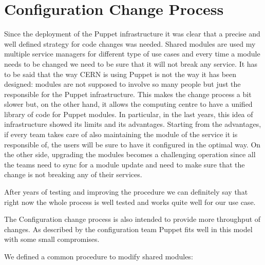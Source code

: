 \section{Configuration Change Process}

Since the deployment of the Puppet infrastructure it was clear that
a precise and well defined strategy for code changes was needed. Shared
modules are used my multiple service managers for different type of use
cases and every time a module needs to be changed we need to be sure that
it will not break any service. It has to be said that the way CERN is
using Puppet is not the way it has been designed: modules are not supposed
to involve so many people but just the responsible for the Puppet
infrastructure. This makes the change process a bit slower but, on the
other hand, it allows the computing centre to have a unified library of
code for Puppet modules. In particular, in the last years, this idea of
infrastructure showed its limits and its advantages. Starting from the
advantages, if every team takes care of also maintaining the module of the
service it is responsible of, the users will be sure to have it configured
in the optimal way. On the other side, upgrading the modules becomes
a challenging operation since all the teams need to sync for a module
update and need to make sure that the change is not breaking any of
their services.

After years of testing and improving the procedure we can definitely say
that right now the whole process is well tested and works quite well for
our use case.

The Configuration change process is also intended to provide more throughput of
changes. As described by the configuration team \cite{benAgile} Puppet fits
well in this model with some small compromises.

We defined a common procedure to modify shared modules:


